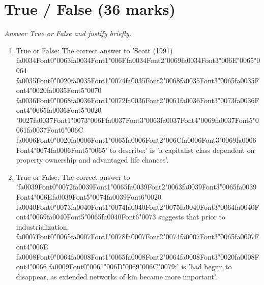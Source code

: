 \documentclass[12pt]{article}
\begin{document}
\section*{True / False (36 marks)}
\textit{Answer True or False and justify briefly.}
\begin{enumerate}[label=\arabic*.]
\item True or False: The correct answer to 'Scott (1991) {\csname fa0034Font0\endcsname\char"0063}{\csname fa0034Font1\endcsname\char"006F}{\csname fa0034Font2\endcsname\char"0069}{\csname fa0034Font3\endcsname\char"006E}{\char"0065}{\char"0064} {\csname fa0035Font0\endcsname\char"0020}{\csname fa0035Font1\endcsname\char"0074}{\csname fa0035Font2\endcsname\char"0068}{\csname fa0035Font3\endcsname\char"0065}{\csname fa0035Font4\endcsname\char"0020}{\csname fa0035Font5\endcsname\char"0070} {\csname fa0036Font0\endcsname\char"0068}{\csname fa0036Font1\endcsname\char"0072}{\csname fa0036Font2\endcsname\char"0061}{\csname fa0036Font3\endcsname\char"0073}{\csname fa0036Font4\endcsname\char"0065}{\csname fa0036Font5\endcsname\char"0020} {\char"0027}{\csname fa0037Font1\endcsname\char"0073}{\char"006F}{\csname fa0037Font3\endcsname\char"0063}{\csname fa0037Font4\endcsname\char"0069}{\csname fa0037Font5\endcsname\char"0061}{\csname fa0037Font6\endcsname\char"006C} {\csname fa0006Font0\endcsname\char"0020}{\csname fa0006Font1\endcsname\char"0065}{\csname fa0006Font2\endcsname\char"006C}{\csname fa0006Font3\endcsname\char"0069}{\csname fa0006Font4\endcsname\char"0074}{\csname fa0006Font5\endcsname\char"0065}' to describe:' is 'a capitalist class dependent on property ownership and advantaged life chances'.
\item True or False: The correct answer to '{\csname fa0039Font0\endcsname\char"0072}{\csname fa0039Font1\endcsname\char"0065}{\csname fa0039Font2\endcsname\char"0063}{\csname fa0039Font3\endcsname\char"0065}{\csname fa0039Font4\endcsname\char"006E}{\csname fa0039Font5\endcsname\char"0074}{\csname fa0039Font6\endcsname\char"0020} {\csname fa0040Font0\endcsname\char"0073}{\csname fa0040Font1\endcsname\char"0074}{\csname fa0040Font2\endcsname\char"0075}{\csname fa0040Font3\endcsname\char"0064}{\csname fa0040Font4\endcsname\char"0069}{\csname fa0040Font5\endcsname\char"0065}{\csname fa0040Font6\endcsname\char"0073} suggests that prior to industrialization, {\csname fa0007Font0\endcsname\char"0065}{\csname fa0007Font1\endcsname\char"0078}{\csname fa0007Font2\endcsname\char"0074}{\csname fa0007Font3\endcsname\char"0065}{\csname fa0007Font4\endcsname\char"006E} {\csname fa0008Font0\endcsname\char"0064}{\csname fa0008Font1\endcsname\char"0065}{\csname fa0008Font2\endcsname\char"0064}{\csname fa0008Font3\endcsname\char"0020}{\csname fa0008Font4\endcsname\char"0066} {\csname fa0009Font0\endcsname\char"0061}{\char"006D}{\char"0069}{\char"006C}{\char"0079}:' is 'had begun to disappear, as extended networks of kin became more important'.

\end{enumerate}
\end{document}
